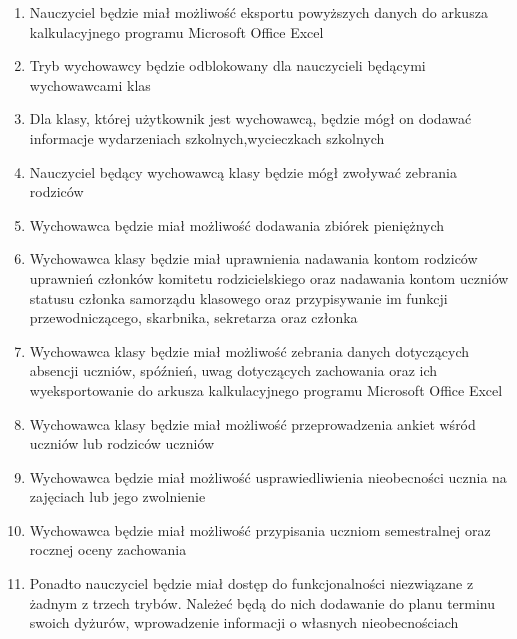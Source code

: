 \documentclass{article}
\begin{document}
\begin{enumerate}
  \item Nauczyciel będzie miał możliwość eksportu powyższych danych do arkusza kalkulacyjnego programu Microsoft Office Excel
  \item Tryb wychowawcy będzie odblokowany dla nauczycieli będącymi wychowawcami klas
  \item Dla klasy, której użytkownik jest wychowawcą, będzie mógł on dodawać informacje wydarzeniach szkolnych,wycieczkach szkolnych
  \item Nauczyciel będący wychowawcą klasy będzie mógł zwoływać zebrania rodziców
  \item Wychowawca będzie miał możliwość dodawania zbiórek pieniężnych
  \item Wychowawca klasy będzie miał uprawnienia nadawania kontom rodziców uprawnień członków komitetu rodzicielskiego oraz nadawania kontom uczniów statusu członka samorządu klasowego oraz przypisywanie im funkcji przewodniczącego, skarbnika, sekretarza oraz członka
  \item Wychowawca klasy będzie miał możliwość zebrania danych dotyczących absencji uczniów, spóźnień, uwag dotyczących zachowania oraz ich wyeksportowanie do arkusza kalkulacyjnego programu Microsoft Office Excel
  \item Wychowawca klasy będzie miał możliwość przeprowadzenia ankiet wśród uczniów lub rodziców uczniów
  \item Wychowawca będzie miał możliwość usprawiedliwienia nieobecności ucznia na zajęciach lub jego zwolnienie
  \item Wychowawca będzie miał możliwość przypisania uczniom semestralnej oraz rocznej oceny zachowania
  \item Ponadto nauczyciel będzie miał dostęp do funkcjonalności niezwiązane z żadnym z trzech trybów. Należeć będą do nich dodawanie do planu terminu swoich dyżurów, wprowadzenie informacji o własnych nieobecnościach
\end{enumerate}
\end{document}
